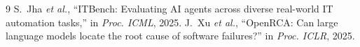 \documentclass[11pt,a4paper]{article}
\begin{document}
\begin{thebibliography}{9}
\small
{} S.~Jha \emph{et al.}, ``ITBench: Evaluating AI agents across diverse real-world IT automation tasks,'' in \emph{Proc. ICML}, 2025.
 J.~Xu \emph{et al.}, ``OpenRCA: Can large language models locate the root cause of software failures?'' in \emph{Proc. ICLR}, 2025.
\end{thebibliography}
\end{document}
